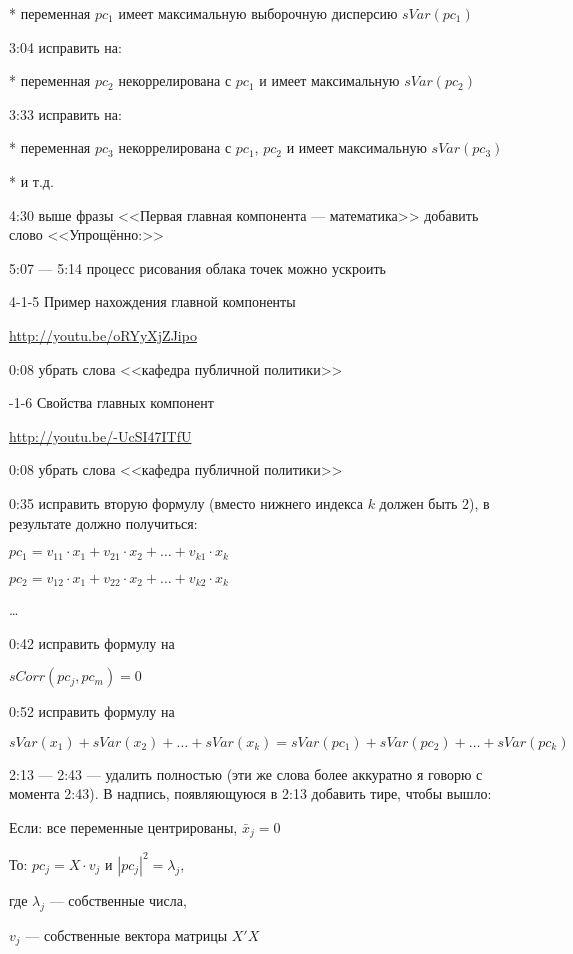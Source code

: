 \documentclass[12pt,a4paper]{article}
\begin{document}
* переменная $pc_1$ имеет максимальную выборочную дисперсию $sVar(pc_1)$

3:04 исправить на:

* переменная $pc_2$ некоррелирована с $pc_1$ и имеет максимальную $sVar(pc_2)$

3:33 исправить на:

* переменная $pc_3$ некоррелирована с $pc_1$, $pc_2$ и имеет максимальную $sVar(pc_3)$

* и т.д.

4:30 выше фразы <<Первая главная компонента --- математика>> добавить слово <<Упрощённо:>>

5:07 --- 5:14 процесс рисования облака точек можно ускроить



4-1-5 Пример нахождения главной компоненты

\url{http://youtu.be/oRYyXjZJipo}

0:08 убрать слова <<кафедра публичной политики>>  



-1-6 Свойства главных компонент 

\url{http://youtu.be/-UcSI47ITfU}

0:08 убрать слова <<кафедра публичной политики>>  

0:35 исправить вторую формулу (вместо нижнего индекса $k$ должен быть $2$), в результате должно получиться:

$pc_1=v_{11} \cdot x_1 +  v_{21} \cdot x_2 + \ldots + v_{k1} \cdot x_k$

$pc_2=v_{12} \cdot x_1 +  v_{22} \cdot x_2 + \ldots + v_{k2} \cdot x_k$

\ldots

0:42 исправить формулу на

$sCorr(pc_j, pc_m)=0$

0:52 исправить формулу на

\[
sVar(x_1)+ sVar(x_2) + \ldots + sVar(x_k) =
sVar(pc_1)+ sVar(pc_2) + \ldots + sVar(pc_k)
\]

2:13 --- 2:43 --- удалить полностью (эти же слова более аккуратно я говорю с момента 2:43). В надпись, появляющуюся в 2:13 добавить тире, чтобы вышло:

Если: все переменные центрированы, $\bar{x}_j=0$

То: $pc_j=X \cdot v_j$ и $|pc_j|^2=\lambda_j$, 

где $\lambda_j$ --- собственные числа,

$v_{j}$ --- собственные вектора матрицы $X'X$
\end{document}
